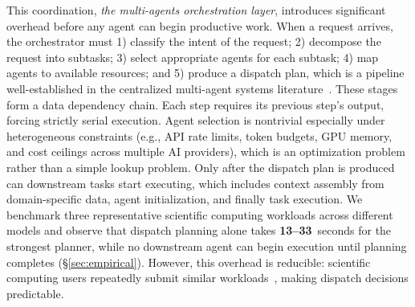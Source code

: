 \documentclass[conference,10pt]{IEEEtran}
\begin{document}
This coordination, \emph{the multi-agents orchestration layer}, introduces significant overhead before any agent can begin productive work.
When a request arrives, the orchestrator must 1) classify the intent of the request; 2) decompose the request into subtasks; 3) select appropriate agents for each subtask; 4) map agents to available resources; and 5) produce a dispatch plan, which is a pipeline well-established in the centralized multi-agent systems literature~\cite{shen2023hugginggpt,qiao2024tdag,li2025masrouter,balaprakash2025swarm}.
These stages form a data dependency chain. Each step requires its previous step's output, forcing strictly serial execution.
Agent selection is nontrivial especially under heterogeneous constraints (e.g., API rate limits, token budgets, GPU memory, and cost ceilings across multiple AI providers), which is an optimization problem rather than a simple lookup problem.
Only after the dispatch plan is produced can downstream tasks start executing, which includes context assembly from domain-specific data, agent initialization, and finally task execution.
We benchmark three representative scientific computing workloads across different models and observe that dispatch planning alone takes \textbf{13--33}~seconds for the strongest planner, while no downstream agent can begin execution until planning completes (\S\ref{sec:empirical}).
However, this overhead is reducible: scientific computing users repeatedly submit similar workloads~\cite{luo2021inferring}, making dispatch decisions predictable.
\end{document}
